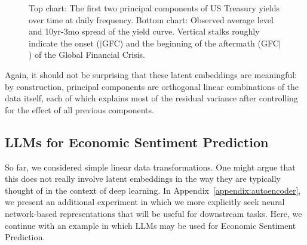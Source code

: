 \documentclass{article}
\theoremstyle{plain}
\theoremstyle{definition}
\theoremstyle{remark}
\begin{document}
\begin{figure}[tb]


\caption{\label{fig-pca-yield}Top chart: The first two principal components of US Treasury yields over time at daily frequency. Bottom chart: Observed average level and 10yr-3mo spread of the yield curve. Vertical stalks roughly indicate the onset ($|$GFC) and the beginning of the aftermath (GFC$|$) of the Global Financial Crisis.}

\end{figure}%

Again, it should not be surprising that these latent embeddings are meaningful: by construction, principal components are orthogonal linear combinations of the data itself, each of which explains most of the residual variance after controlling for the effect of all previous components.

\subsection{LLMs for Economic Sentiment Prediction}\label{ex-llm}

So far, we considered simple linear data transformations. One might argue that this does not really involve latent embeddings in the way they are typically thought of in the context of deep learning. In Appendix~\ref{appendix:autoencoder}, we present an additional experiment in which we more explicitly seek neural network-based representations that will be useful for downstream tasks. Here, we continue with an example in which LLMs may be used for Economic Sentiment Prediction.
\end{document}
